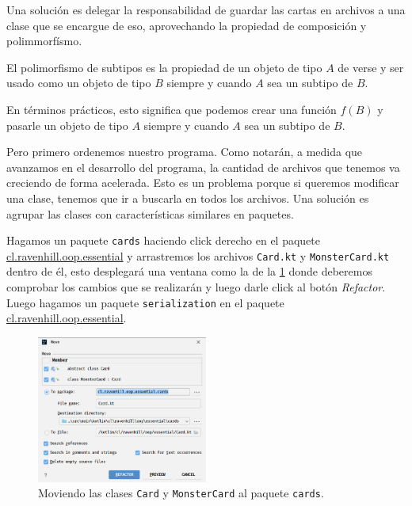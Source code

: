   Una solución es delegar la responsabilidad de guardar las cartas en archivos a una clase que se 
  encargue de eso, aprovechando la propiedad de composición y polimmorfísmo.

  \begin{defaultbox}
    El polimorfismo de subtipos es la propiedad de un objeto de tipo \(A\) de verse y ser usado como
    un objeto de tipo \(B\) siempre y cuando \(A\) sea un subtipo de \(B\).
  \end{defaultbox}

  En términos prácticos, esto significa que podemos crear una función \(f(B)\) y pasarle un objeto
  de tipo \(A\) siempre y cuando \(A\) sea un subtipo de \(B\).

  Pero primero ordenemos nuestro programa.
  Como notarán, a medida que avanzamos en el desarrollo del programa, la cantidad de archivos que
  tenemos va creciendo de forma acelerada.
  Esto es un problema porque si queremos modificar una clase, tenemos que ir a buscarla en todos
  los archivos.
  Una solución es agrupar las clases con características similares en paquetes.

  Hagamos un paquete \texttt{cards} haciendo click derecho en el paquete 
  \url{cl.ravenhill.oop.essential} y arrastremos los archivos \texttt{Card.kt} y
  \texttt{MonsterCard.kt} dentro de él, esto desplegará una ventana como la de la 
  \cref{fig:oop:principios:clases_abstractas:move} donde deberemos comprobar los cambios que se
  realizarán y luego darle click al botón \textit{Refactor}.
  Luego hagamos un paquete \texttt{serialization} en el paquete \url{cl.ravenhill.oop.essential}.

  \begin{figure}[ht!]
    \centering
    \includegraphics[width=0.5\textwidth]{img/oop/principios/clases_abstractas/idea64_move.png}
    \caption{Moviendo las clases \texttt{Card} y \texttt{MonsterCard} al paquete \texttt{cards}.}
    \label{fig:oop:principios:clases_abstractas:move}
  \end{figure}

